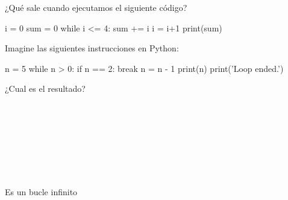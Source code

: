 \begin{ejercicio}¿Qué sale cuando ejecutamos el siguiente código?

\begin{python}
i = 0
sum = 0
while i <= 4:
    sum += i
    i = i+1
print(sum)
\end{python}

\begin{choices}
\end{choices}




\end{ejercicio}  

\begin{ejercicio}Imagine las siguientes instrucciones en Python:


\begin{python}
n = 5
while n > 0:
    if n == 2:
        break
    n = n - 1
    print(n)
print('Loop ended.')
\end{python}

¿Cual es el resultado?

\begin{choices}
    \choice %
\\
\\
\\
    \choice 
{}\\
\\
\\
\\
    \choice Es un bucle infinito
    \choice {}
\end{choices}

\end{ejercicio}  

\newpage

